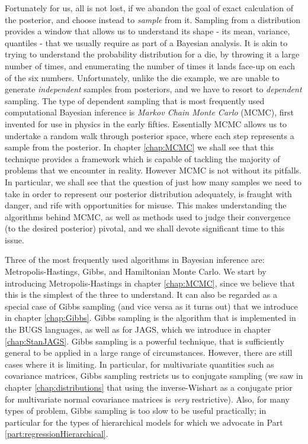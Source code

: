 \documentclass[11pt,fullpage]{book}
\begin{document}
Fortunately for us, all is not lost, if we abandon the goal of exact calculation of the posterior, and choose instead to \textit{sample} from it. Sampling from a distribution provides a window that allows us to understand its shape - its mean, variance, quantiles - that we usually require as part of a Bayesian analysis. It is akin to trying to understand the probability distribution for a die, by throwing it a large number of times, and enumerating the number of times it lands face-up on each of the six numbers. Unfortunately, unlike the die example, we are unable to generate \textit{independent} samples from posteriors, and we have to resort to \textit{dependent} sampling. The type of dependent sampling that is most frequently used computational Bayesian inference is \textit{Markov Chain Monte Carlo} (MCMC), first invented for use in physics in the early fifties. Essentially MCMC allows us to undertake a random walk through posterior space, where each step represents a sample from the posterior. In chapter \ref{chap:MCMC} we shall see that this technique provides a framework which is capable of tackling the majority of problems that we encounter in reality. However MCMC is not without its pitfalls. In particular, we shall see that the question of just how many samples we need to take in order to represent our posterior distribution adequately, is fraught with danger, and rife with opportunities for misuse. This makes understanding the algorithms behind MCMC, as well as methods used to judge their convergence (to the desired posterior) pivotal, and we shall devote significant time to this issue.

Three of the most frequently used algorithms in Bayesian inference are: Metropolis-Hastings, Gibbs, and Hamiltonian Monte Carlo. We start by introducing Metropolis-Hastings in chapter \ref{chap:MCMC}, since we believe that this is the simplest of the three to understand. It can also be regarded as a special case of Gibbs sampling (and vice versa as it turns out) that we introduce in chapter \ref{chap:Gibbs}. Gibbs sampling is the algorithm that is implemented in the BUGS languages, as well as for JAGS, which we introduce in chapter \ref{chap:StanJAGS}. Gibbs sampling is a powerful technique, that is sufficiently general to be applied in a large range of circumstances. However, there are still cases where it is limiting. In particular, for multivariate quantities such as covariance matrices, Gibbs sampling restricts us to conjugate sampling (we saw in chapter \ref{chap:distributions} that using the inverse-Wishart as a conjugate prior for multivariate normal covariance matrices is \textit{very} restrictive). Also, for many types of problem, Gibbs sampling is too slow to be useful practically; in particular for the types of hierarchical models for which we advocate in Part \ref{part:regressionHierarchical}.
\end{document}
